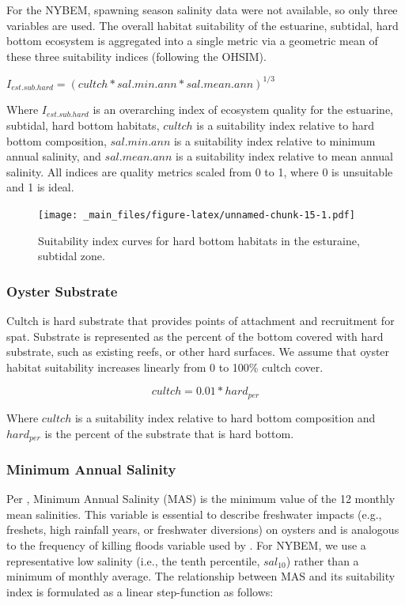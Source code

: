 \documentclass[
]{book}
\begin{document}
For the NYBEM, spawning season salinity data were not available, so only three variables are used. The overall habitat suitability of the estuarine, subtidal, hard bottom ecosystem is aggregated into a single metric via a geometric mean of these three suitability indices (following the OHSIM).

\(I_{est.sub.hard} = {(cultch * sal.min.ann * sal.mean.ann)}^{1/3}\)

Where \(I_{est.sub.hard}\) is an overarching index of ecosystem quality for the estuarine, subtidal, hard bottom habitats, \(cultch\) is a suitability index relative to hard bottom composition, \(sal.min.ann\) is a suitability index relative to minimum annual salinity, and \(sal.mean.ann\) is a suitability index relative to mean annual salinity. All indices are quality metrics scaled from 0 to 1, where 0 is unsuitable and 1 is ideal.

\begin{figure}
\centering
\texttt{[image: \_main\_files/figure-latex/unnamed-chunk-15-1.pdf]}
\caption{\label{fig:unnamed-chunk-15}Suitability index curves for hard bottom habitats in the esturaine, subtidal zone.}
\end{figure}

\hypertarget{oyster-substrate}{%
\subsubsection{Oyster Substrate}\label{oyster-substrate}}

Cultch is hard substrate that provides points of attachment and recruitment for spat. Substrate is represented as the percent of the bottom covered with hard substrate, such as existing reefs, or other hard surfaces. We assume that oyster habitat suitability increases linearly from 0 to 100\% cultch cover.

\[cultch = 0.01*hard_{per}\]

Where \(cultch\) is a suitability index relative to hard bottom composition and \(hard_{per}\) is the percent of the substrate that is hard bottom.

\hypertarget{minimum-annual-salinity}{%
\subsubsection{Minimum Annual Salinity}\label{minimum-annual-salinity}}

Per \citet{swannack_robust_2014}, Minimum Annual Salinity (MAS) is the minimum value of the 12 monthly mean salinities. This variable is essential to describe freshwater impacts (e.g., freshets, high rainfall years, or freshwater diversions) on oysters and is analogous to the frequency of killing floods variable used by \citet{cake_habitat_1983}. For NYBEM, we use a representative low salinity (i.e., the tenth percentile, \(sal_{10}\)) rather than a minimum of monthly average. The relationship between MAS and its suitability index is formulated as a linear step-function as follows:
\end{document}
